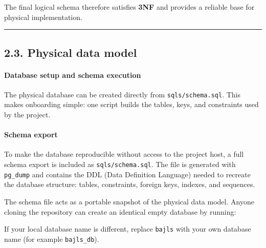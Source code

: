 The final logical schema therefore satisfies \textbf{3NF} and provides a
reliable base for physical implementation.

\begin{center}\rule{0.5\linewidth}{0.5pt}\end{center}

\newpage

\hypertarget{physical-data-model}{%
\subsection{2.3. Physical data model}\label{physical-data-model}}

\hypertarget{database-setup-and-schema-execution}{%
\paragraph{Database setup and schema
execution}\label{database-setup-and-schema-execution}}

The physical database can be created directly from
\texttt{sqls/schema.sql}. This makes onboarding simple: one script
builds the tables, keys, and constraints used by the project.

\hypertarget{schema-export}{%
\paragraph{Schema export}\label{schema-export}}

To make the database reproducible without access to the project host, a
full schema export is included as \texttt{sqls/schema.sql}. The file is
generated with \texttt{pg\_dump} and contains the DDL (Data Definition
Language) needed to recreate the database structure: tables,
constraints, foreign keys, indexes, and sequences.

The schema file acts as a portable snapshot of the physical data model.
Anyone cloning the repository can create an identical empty database by
running:

\begin{Shaded}
\begin{Highlighting}[]
 
\end{Highlighting}
\end{Shaded}

If your local database name is different, replace \texttt{bajls} with
your own database name (for example \texttt{bajls\_db}).

